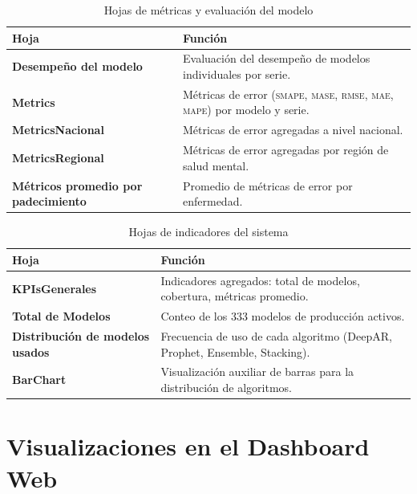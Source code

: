 \documentclass[12pt, letterpaper]{article}
\newcommand{\smape}{\textnormal{\textsc{smape}}}
\newcommand{\mase}{\textnormal{\textsc{mase}}}
\newcommand{\rmse}{\textnormal{\textsc{rmse}}}
\newcommand{\mae}{\textnormal{\textsc{mae}}}
\newcommand{\mape}{\textnormal{\textsc{mape}}}
\begin{document}
\begin{table}[H]
\centering
\caption{Hojas de métricas y evaluación del modelo}
\label{tab:hojas_metricas}
\small
\begin{tabularx}{\textwidth}{>{\bfseries}l X}
\toprule
\textbf{Hoja} & \textbf{Función} \\
\midrule
Desempeño del modelo  & Evaluación del desempeño de modelos individuales por serie. \\
Metrics               & Métricas de error (\smape{}, \mase{}, \rmse{}, \mae{}, \mape{}) por modelo y serie. \\
MetricsNacional       & Métricas de error agregadas a nivel nacional. \\
MetricsRegional       & Métricas de error agregadas por región de salud mental. \\
Métricos promedio por padecimiento & Promedio de métricas de error por enfermedad. \\
\bottomrule
\end{tabularx}
\end{table}

\begin{table}[H]
\centering
\caption{Hojas de indicadores del sistema}
\label{tab:hojas_kpis}
\small
\begin{tabularx}{\textwidth}{>{\bfseries}l X}
\toprule
\textbf{Hoja} & \textbf{Función} \\
\midrule
KPIsGenerales               & Indicadores agregados: total de modelos, cobertura, métricas promedio. \\
Total de Modelos            & Conteo de los 333 modelos de producción activos. \\
Distribución de modelos usados & Frecuencia de uso de cada algoritmo (DeepAR, Prophet, Ensemble, Stacking). \\
BarChart                    & Visualización auxiliar de barras para la distribución de algoritmos. \\
\bottomrule
\end{tabularx}
\end{table}

\newpage
\section{Visualizaciones en el Dashboard Web}\label{sec:visualizaciones_web}
\end{document}
